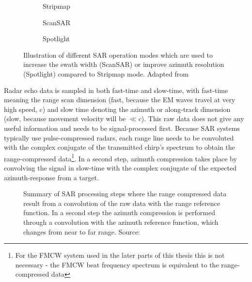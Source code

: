 \begin{figure}[htbp]
    \begin{subfigure}{\linewidth}
        \centering
        \def\svgscale{1.0}
        
        \caption{Stripmap}
        \bigskip
    \end{subfigure}
    \begin{subfigure}{0.45\linewidth}
        \centering
        \def\svgscale{0.75}
        
        \caption{ScanSAR}
    \end{subfigure}
    \hfill
    \begin{subfigure}{0.45\linewidth}
        \centering
        \def\svgscale{0.75}
        
        \caption{Spotlight}
    \end{subfigure}
    \caption{\label{fig:sar_modes}Illustration of different SAR operation modes which are used to increase the swath width (ScanSAR) or improve azimuth resolution (Spotlight) compared to Stripmap mode. Adapted from \cite{Moreira2013}}
\end{figure}

Radar echo data is sampled in both fast-time and slow-time, with
fast-time meaning the range scan dimension (fast, because the EM waves
travel at very high speed, \(c\)) and slow time denoting the azimuth or
along-track dimension (slow, because movement velocity will be
\(\ll c\)). This raw data does not give any useful information and needs
to be signal-processed first. Because SAR systems typically use
pulse-compressed radars, each range line needs to be convoluted with the
complex conjugate of the transmitted chirp's spectrum to obtain the
range-compressed
data\footnote{For the FMCW system used in the later parts of this thesis this is not necessary - the FMCW beat frequency spectrum is equivalent to the range-compressed data}.
In a second step, azimuth compression takes place by convolving the
signal in slow-time with the complex conjugate of the expected
azimuth-response from a target.

\begin{figure}[htbp]
    \centering
    \def\svgwidth{\linewidth}
    
    \caption{\label{fig_sar_steps}Summary of SAR processing steps where the range compressed data result from a convolution of the raw data with the range reference function. In a second step the azimuth compression is performed through a convolution with the azimuth reference function, which changes from near to far range. Source: \cite{Moreira2013}}
\end{figure}

